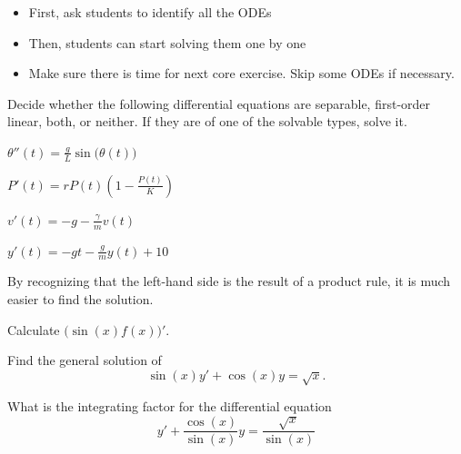 

\begin{annotation}
\begin{goals}
	\begin{itemize}
		\item First, ask students to identify all the ODEs
		\item Then, students can start solving them one by one \\
	\end{itemize}
\end{goals}	
\begin{notes}
	\begin{itemize}
		\item Make sure there is time for next core exercise. Skip some ODEs if necessary.
	\end{itemize}	
\end{notes}
\end{annotation}

\question 
	Decide whether the following differential equations are separable, first-order linear, both, or neither. If they are of one of the solvable types, solve it.

\begin{parts}
	\item $\displaystyle\theta''(t) = \frac{g}{L} \sin\big(\theta(t)\big)$
	\item $\displaystyle P'(t) = r P(t) \left( 1 - \frac{P(t)}{K} \right)$
	\item $\displaystyle v'(t) = -g - \frac{\gamma}{m} v(t)$
	\item $\displaystyle y'(t) = -gt - \frac{g}{m} y(t) + 10$
\end{parts}











\bookonlynewpage




\begin{annotation}
\begin{goals}
	By recognizing that the left-hand side is the result of a product rule, it is much easier to find the solution.
\end{goals}
\end{annotation}
\question
\begin{parts}
	\item Calculate $\big( \sin(x) f(x) \big)'$.
	\item Find the general solution of 
		$$ \sin(x) y' + \cos(x) y = \sqrt{x}.$$
	\item What is the integrating factor for the differential equation
		$$ y' + \frac{\cos(x)}{\sin(x)} y = \frac{\sqrt{x}}{\sin(x)}$$
\end{parts}










